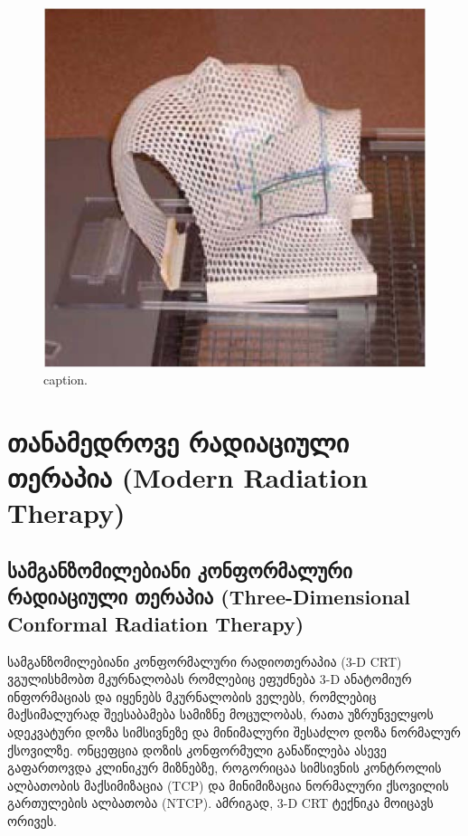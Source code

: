 \documentclass[12pt,a4paper,]{report}
\begin{document}
	\begin{figure}[!h]
	    \centering
        \includegraphics[width = 15cm]{images/ptpaid_02}
        \caption{caption.}
    \end{figure}

\chapter{თანამედროვე რადიაციული თერაპია (Modern Radiation Therapy)}
\section{სამგანზომილებიანი კონფორმალური რადიაციული თერაპია (Three-Dimensional Conformal Radiation Therapy)}
სამგანზომილებიანი კონფორმალური რადიოთერაპია (3-D CRT) ვგულისხმობთ მკურნალობას რომლებიც ეფუძნება 3-D ანატომიურ ინფორმაციას და იყენებს მკურნალობის ველებს, რომლებიც მაქსიმალურად შეესაბამება სამიზნე მოცულობას, რათა უზრუნველყოს ადეკვატური დოზა სიმსივნეზე და მინიმალური შესაძლო დოზა ნორმალურ ქსოვილზე. ონცეფცია დოზის კონფორმული განაწილება ასევე გაფართოვდა კლინიკურ მიზნებზე, როგორიცაა სიმსივნის კონტროლის ალბათობის მაქსიმიზაცია (TCP) და მინიმიზაცია ნორმალური ქსოვილის გართულების ალბათობა (NTCP). ამრიგად, 3-D CRT ტექნიკა მოიცავს ორივეს.
\end{document}
